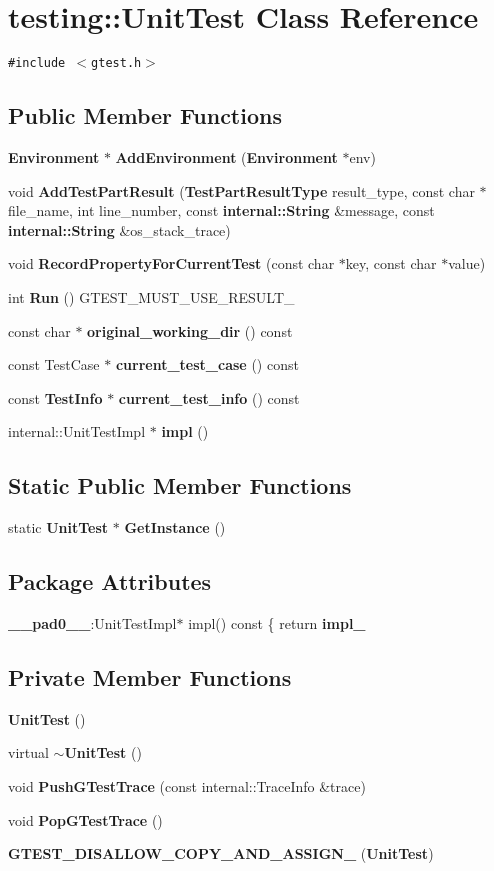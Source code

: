 \section{testing::UnitTest Class Reference}
\label{classtesting_1_1UnitTest}
{\tt \#include $<$gtest.h$>$}

\subsection*{Public Member Functions}
\begin{CompactItemize}
\item 
{\bf Environment} $\ast$ {\bf AddEnvironment} ({\bf Environment} $\ast$env)
\item 
void {\bf AddTestPartResult} ({\bf TestPartResultType} result\_\-type, const char $\ast$file\_\-name, int line\_\-number, const {\bf internal::String} \&message, const {\bf internal::String} \&os\_\-stack\_\-trace)
\item 
void {\bf RecordPropertyForCurrentTest} (const char $\ast$key, const char $\ast$value)
\item 
int {\bf Run} () GTEST\_\-MUST\_\-USE\_\-RESULT\_\-
\item 
const char $\ast$ {\bf original\_\-working\_\-dir} () const
\item 
const TestCase $\ast$ {\bf current\_\-test\_\-case} () const
\item 
const {\bf TestInfo} $\ast$ {\bf current\_\-test\_\-info} () const
\item 
internal::UnitTestImpl $\ast$ {\bf impl} ()
\end{CompactItemize}
\subsection*{Static Public Member Functions}
\begin{CompactItemize}
\item 
static {\bf UnitTest} $\ast$ {\bf GetInstance} ()
\end{CompactItemize}
\subsection*{Package Attributes}
\begin{CompactItemize}
\item 
{\bf \_\-\_\-pad0\_\-\_\-}:UnitTestImpl$\ast$ impl() const \{ return {\bf impl\_\-}
\end{CompactItemize}
\subsection*{Private Member Functions}
\begin{CompactItemize}
\item 
{\bf UnitTest} ()
\item 
virtual {\bf $\sim$UnitTest} ()
\item 
void {\bf PushGTestTrace} (const internal::TraceInfo \&trace)
\item 
void {\bf PopGTestTrace} ()
\item 
{\bf GTEST\_\-DISALLOW\_\-COPY\_\-AND\_\-ASSIGN\_\-} ({\bf UnitTest})
\end{CompactItemize}
